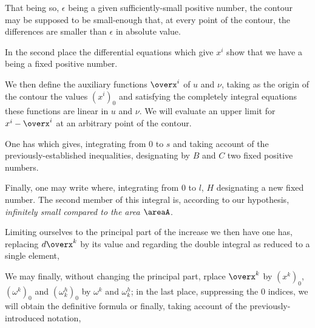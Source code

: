 That being so, $\epsilon$ being a given sufficiently-small positive number, the contour may be supposed to be small-enough that, at every point of the contour, the differences
are smaller than $\epsilon$ in absolute value.

In the second place the differential equations which give $x^i$ show that we have
a being a fixed positive number.

We then define the auxiliary functions $\overx^i$ of $u$ and $\nu$, taking as the origin of the contour the values $(x^i)_0$ and satisfying the completely integral equations
these functions are linear in $u$ and $\nu$. We will evaluate an upper limit for $x^i - \overx^i$ at an arbitrary point of the contour.

One has
which gives, integrating from $0$ to $s$ and taking account of the previously-established inequalities,
designating by $B$ and $C$ two fixed positive numbers.

Finally, one may write
where, integrating from $0$ to $l$,
$H$ designating a new fixed number. The second member of this integral is, according to our hypothesis, \textit{infinitely small compared to the area $\areaA$}.

Limiting ourselves to the principal part of the increase
we then have
one has, replacing $d\overx^k$ by its value and regarding the double integral as reduced to a single element,

We may finally, without changing the principal part, rplace $\overx^k$ by $(x^k)_0$, $(\omega^k)_0$ and $(\omega_k^h)_0$ by $\omega^k$ and $\omega_k^h$; in the last place, suppressing the $0$ indices, we will obtain the definitive formula
or finally, taking account of the previously-introduced notation,

